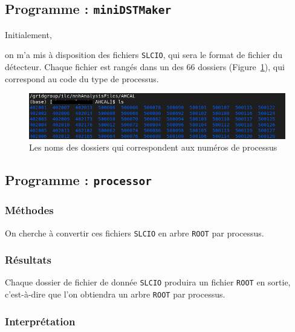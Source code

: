 \documentclass[10pt,a4paper]{report}
\newcommand{\cad}{c'est-à-dire\xspace}
\newcommand{\ROOT}{\texttt{ROOT}\xspace}
\newcommand{\SLCIO}{\texttt{SLCIO}\xspace}
\newcommand{\minidstmarker}{\texttt{miniDSTMaker}\xspace}
\newcommand{\processor}{\texttt{processor}\xspace}
\begin{document}
\subsection{Programme : \minidstmarker}

Initialement, 


on m'a mis à disposition des fichiers \SLCIO, qui sera le format de fichier du détecteur.
Chaque fichier est rangés dans un des 66 dossiers (Figure~\ref{listeProcessus}), qui correspond au code du type de processus.

\begin{figure}[h!]
	\includegraphics[width=\textwidth]{../img/listeProcessus.png} 
	\caption{Les noms des dossiers qui correspondent aux numéros de processus}
	\label{listeProcessus}
\end{figure}


\subsection{Programme : \processor}

\subsubsection{Méthodes}

On cherche à convertir ces fichiers \SLCIO en arbre \ROOT par processus.

\subsubsection{Résultats}

Chaque dossier de fichier de donnée \SLCIO produira un fichier \ROOT en sortie, \cad que l'on obtiendra un arbre \ROOT par processus.


\subsubsection{Interprétation}
\end{document}
